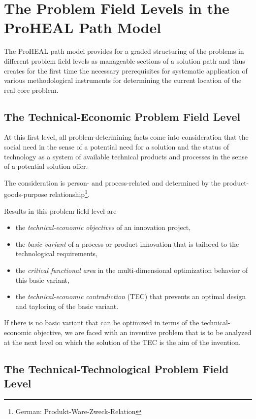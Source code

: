 \documentclass[11pt,a4paper]{article}
\begin{document}
\section{The Problem Field Levels in the ProHEAL Path Model}

The ProHEAL path model provides for a graded structuring of the problems in
different problem field levels as manageable sections of a solution path and
thus creates for the first time the necessary prerequisites for systematic
application of various methodological instruments for determining the current
location of the real core problem.

\subsection{The Technical-Economic Problem Field Level}

At this first level, all problem-determining facts come into consideration
that the social need in the sense of a potential need for a solution and the
status of technology as a system of available technical products and processes
in the sense of a potential solution offer.

The consideration is person- and process-related and determined by the
product-goods-purpose relationship\footnote{German:
  Produkt-Ware-Zweck-Relation}.

Results in this problem field level are
\begin{itemize}
\item the \emph{technical-economic objectives} of an innovation project,
\item the \emph{basic variant} of a process or product innovation that is
  tailored to the technological requirements,
\item the \emph{critical functional area} in the multi-dimensional
  optimization behavior of this basic variant,
\item the \emph{technical-economic contradiction} (TEC) that prevents an
  optimal design and tayloring of the basic variant.
\end{itemize}
If there is no basic variant that can be optimized in terms of the
technical-economic objective, we are faced with an inventive problem that is
to be analyzed at the next level on which the solution of the TEC is the aim
of the invention.

\subsection{The Technical-Technological Problem Field Level}
\end{document}
